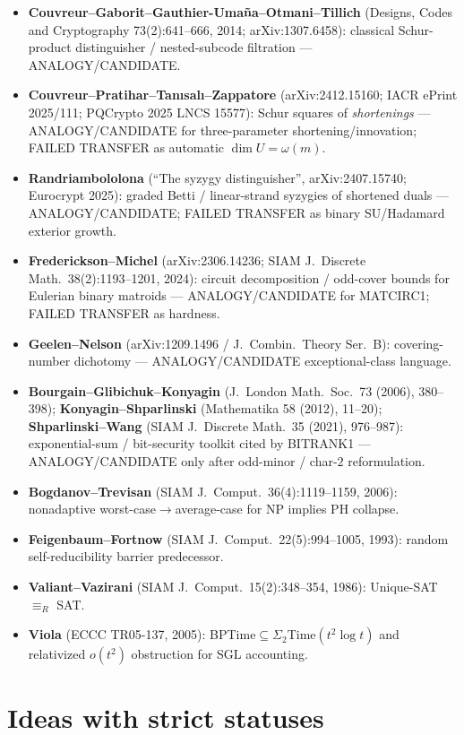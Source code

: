 \documentclass[11pt]{article}
\begin{document}
\begin{itemize}
\item \textbf{Couvreur--Gaborit--Gauthier-Uma\~na--Otmani--Tillich}
(Designs, Codes and Cryptography 73(2):641--666, 2014; arXiv:1307.6458): classical
Schur-product distinguisher / nested-subcode filtration --- ANALOGY/CANDIDATE.
\item \textbf{Couvreur--Pratihar--Tan{\i}sal{\i}--Zappatore} (arXiv:2412.15160; IACR ePrint
2025/111; PQCrypto 2025 LNCS 15577): Schur squares of \emph{shortenings} ---
ANALOGY/CANDIDATE for three-parameter shortening/innovation; FAILED TRANSFER as
automatic $\dim U=\omega(m)$.
\item \textbf{Randriambololona} (``The syzygy distinguisher'', arXiv:2407.15740; Eurocrypt 2025):
graded Betti / linear-strand syzygies of shortened duals --- ANALOGY/CANDIDATE;
FAILED TRANSFER as binary SU/Hadamard exterior growth.
\item \textbf{Frederickson--Michel} (arXiv:2306.14236; SIAM J.\ Discrete Math.\ 38(2):1193--1201,
2024): circuit decomposition / odd-cover bounds for Eulerian binary matroids ---
ANALOGY/CANDIDATE for MATCIRC1; FAILED TRANSFER as hardness.
\item \textbf{Geelen--Nelson} (arXiv:1209.1496 / J.\ Combin.\ Theory Ser.\ B): covering-number
dichotomy --- ANALOGY/CANDIDATE exceptional-class language.
\item \textbf{Bourgain--Glibichuk--Konyagin} (J.\ London Math.\ Soc.\ 73 (2006), 380--398);
\textbf{Konyagin--Shparlinski} (Mathematika 58 (2012), 11--20);
\textbf{Shparlinski--Wang} (SIAM J.\ Discrete Math.\ 35 (2021), 976--987):
exponential-sum / bit-security toolkit cited by BITRANK1 --- ANALOGY/CANDIDATE only
after odd-minor / char-$2$ reformulation.
\item \textbf{Bogdanov--Trevisan} (SIAM J.\ Comput.\ 36(4):1119--1159, 2006): nonadaptive
worst-case$\to$average-case for NP implies PH collapse.
\item \textbf{Feigenbaum--Fortnow} (SIAM J.\ Comput.\ 22(5):994--1005, 1993): random
self-reducibility barrier predecessor.
\item \textbf{Valiant--Vazirani} (SIAM J.\ Comput.\ 15(2):348--354, 1986): Unique-SAT $\equiv_R$ SAT.
\item \textbf{Viola} (ECCC TR05-137, 2005): BPTime$\subseteq\Sigma_2$Time$(t^2\log t)$ and
relativized $o(t^2)$ obstruction for SGL accounting.
\end{itemize}

\section*{Ideas with strict statuses}
\end{document}

